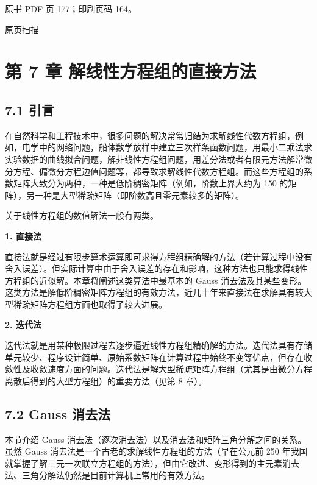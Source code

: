 \clearpage

原书 PDF 页 177；印刷页码 164。

\href{source-images/pdf-177.jpeg}{原页扫描}

\section{第 7 章 解线性方程组的直接方法}\label{ch07a-ux7b2c-7-ux7ae0-ux89e3ux7ebfux6027ux65b9ux7a0bux7ec4ux7684ux76f4ux63a5ux65b9ux6cd5}

\subsection{7.1 引言}\label{ch07a-ux5f15ux8a00}

在自然科学和工程技术中，很多问题的解决常常归结为求解线性代数方程组，例如，电学中的网络问题，船体数学放样中建立三次样条函数问题，用最小二乘法求实验数据的曲线拟合问题，解非线性方程组问题，用差分法或者有限元方法解常微分方程、偏微分方程边值问题等，都导致求解线性代数方程组。而这些方程组的系数矩阵大致分为两种，一种是低阶稠密矩阵（例如，阶数上界大约为 150 的矩阵），另一种是大型稀疏矩阵（即阶数高且零元素较多的矩阵）。

关于线性方程组的数值解法一般有两类。

\textbf{1. 直接法}

直接法就是经过有限步算术运算即可求得方程组精确解的方法（若计算过程中没有舍入误差）。但实际计算中由于舍入误差的存在和影响，这种方法也只能求得线性方程组的近似解。本章将阐述这类算法中最基本的 Gauss 消去法及其某些变形。这类方法是解低阶稠密矩阵方程组的有效方法，近几十年来直接法在求解具有较大型稀疏矩阵方程组方面也取得了较大进展。

\textbf{2. 迭代法}

迭代法就是用某种极限过程去逐步逼近线性方程组精确解的方法。迭代法具有存储单元较少、程序设计简单、原始系数矩阵在计算过程中始终不变等优点，但存在收敛性及收敛速度方面的问题。迭代法是解大型稀疏矩阵方程组（尤其是由微分方程离散后得到的大型方程组）的重要方法（见第 8 章）。

\subsection{7.2 Gauss 消去法}\label{ch07a-gauss-ux6d88ux53bbux6cd5}

本节介绍 Gauss 消去法（逐次消去法）以及消去法和矩阵三角分解之间的关系。虽然 Gauss 消去法是一个古老的求解线性方程组的方法（早在公元前 250 年我国就掌握了解三元一次联立方程组的方法），但由它改进、变形得到的主元素消去法、三角分解法仍然是目前计算机上常用的有效方法。

